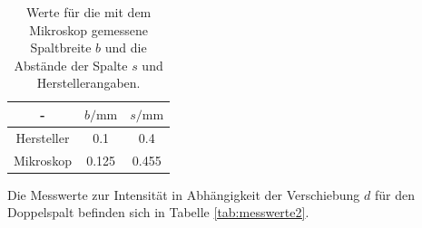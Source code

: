   \begin{table}
    \caption{Werte für die mit dem Mikroskop gemessene Spaltbreite $b$ und die Abstände der Spalte $s$ und Herstellerangaben.}
    \centering
    \label{tab:s}
    \begin{tabular}{c c c}
      \toprule
     - & $b/\si{\milli\meter}$ & $s/\si{\milli\meter}$\\
     \midrule
     Hersteller & 0.1 & 0.4 \\
     Mikroskop & 0.125 & 0.455 \\
     \bottomrule
     \end{tabular}
  \end{table}

  Die Messwerte zur Intensität in Abhängigkeit der Verschiebung $d$ für den Doppelspalt befinden sich in Tabelle \ref{tab:messwerte2}.

